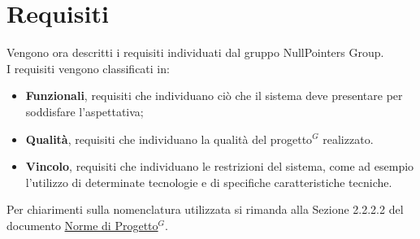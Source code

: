 \section{Requisiti}
Vengono ora descritti i requisiti individuati dal gruppo NullPointers Group.\\
I requisiti vengono classificati in:
\begin{itemize}
   \item \textbf{Funzionali}, requisiti che individuano ciò che il sistema deve presentare per soddisfare
   l'aspettativa; 
   \item \textbf{Qualità}, requisiti che individuano la qualità del progetto$^G$ realizzato.
   \item \textbf{Vincolo}, requisiti che individuano le restrizioni del sistema, come ad esempio l'utilizzo di determinate tecnologie e di specifiche caratteristiche tecniche.
\end{itemize}

Per chiarimenti sulla nomenclatura utilizzata si rimanda alla Sezione 2.2.2.2 del documento \href{https://nullpointersgroup.github.io/Documentazione/output/PB/Documenti%20Interni/Norme_di_Progetto.pdf}{Norme di Progetto$^G$}.
